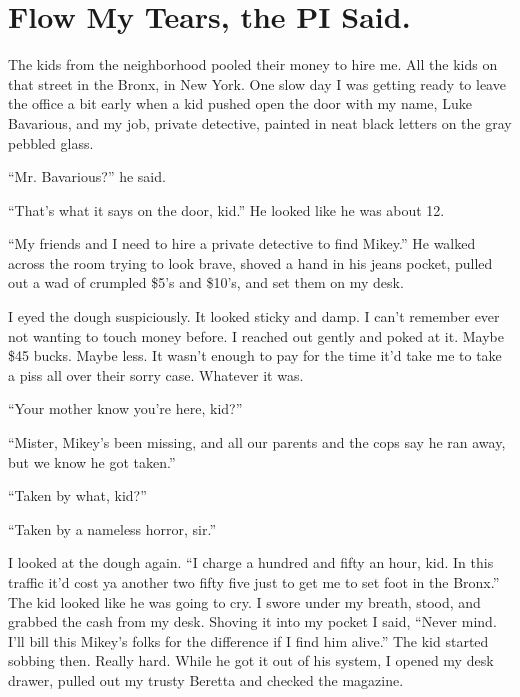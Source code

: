 \chapter{Flow My Tears, the PI Said.}


The kids from the neighborhood pooled their money to hire me. All
the kids on that street in the Bronx, in New York. One slow day I
was getting ready to leave the office a bit early when a kid pushed
open the door with my name, Luke Bavarious, and my job, private
detective, painted in neat black letters on the gray pebbled
glass.



``Mr. Bavarious?'' he said.

``That's what it says on the door, kid.'' He looked
like he was about 12.

``My friends and I need to hire a private detective to find
Mikey.'' He walked across the room trying to look brave,
shoved a hand in his jeans pocket, pulled out a wad of crumpled
\$5's and \$10's, and set them on my desk.



I eyed the dough suspiciously. It looked sticky and damp. I
can't remember ever not wanting to touch money before. I
reached out gently and poked at it. Maybe \$45 bucks. Maybe less. It
wasn't enough to pay for the time it'd take me to take
a piss all over their sorry case. Whatever it was.



``Your mother know you're here, kid?''

``Mister, Mikey's been missing, and all our parents and
the cops say he ran away, but we know he got taken.''

``Taken by what, kid?''

``Taken by a nameless horror, sir.''



I looked at the dough again. ``I charge a hundred and fifty an
hour, kid. In this traffic it'd cost ya another two fifty
five just to get me to set foot in the Bronx.'' The kid looked
like he was going to cry. I swore under my breath, stood, and
grabbed the cash from my desk. Shoving it into my pocket I said,
``Never mind. I'll bill this Mikey's folks for the
difference if I find him alive.'' The kid started sobbing
then. Really hard. While he got it out of his system, I opened my
desk drawer, pulled out my trusty Beretta and checked the
magazine.



